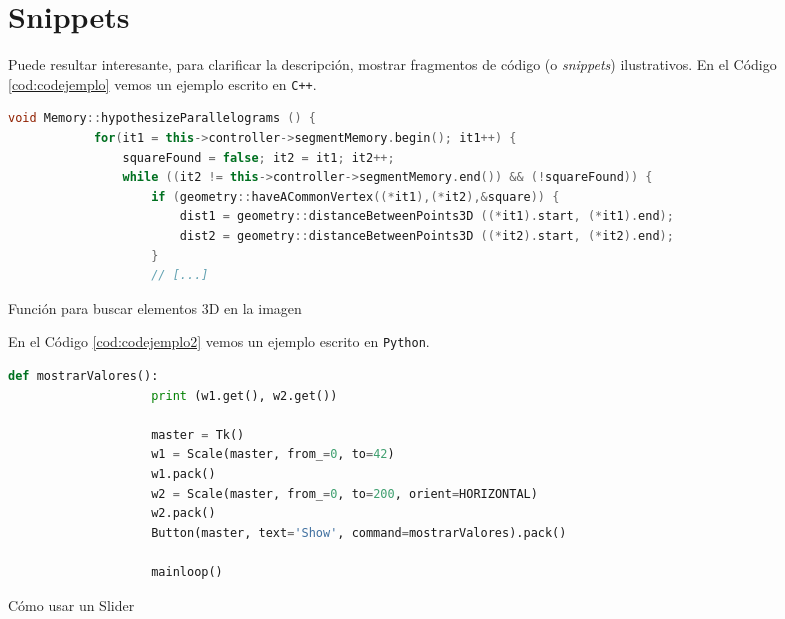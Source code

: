 


\section{Snippets}

Puede resultar interesante, para clarificar la descripción, mostrar fragmentos de código (o \textit{snippets}) ilustrativos. En el Código \ref{cod:codejemplo} vemos un ejemplo escrito en \texttt{C++}.

\begin{code}[h]
	\begin{lstlisting}[language=C++]
		void Memory::hypothesizeParallelograms () {
			for(it1 = this->controller->segmentMemory.begin(); it1++) {
				squareFound = false; it2 = it1; it2++;
				while ((it2 != this->controller->segmentMemory.end()) && (!squareFound)) {
					if (geometry::haveACommonVertex((*it1),(*it2),&square)) {
						dist1 = geometry::distanceBetweenPoints3D ((*it1).start, (*it1).end);
						dist2 = geometry::distanceBetweenPoints3D ((*it2).start, (*it2).end);
					}
					// [...]
				\end{lstlisting}
				\caption[Función para buscar elementos 3D en la imagen]{Función para buscar elementos 3D en la imagen}
				\label{cod:codejemplo}
			\end{code}
			
			En el Código \ref{cod:codejemplo2} vemos un ejemplo escrito en \texttt{Python}.
			
			\begin{code}[h]
				\begin{lstlisting}[language=Python]
					def mostrarValores():
					print (w1.get(), w2.get())
					
					master = Tk()
					w1 = Scale(master, from_=0, to=42)
					w1.pack()
					w2 = Scale(master, from_=0, to=200, orient=HORIZONTAL)
					w2.pack()
					Button(master, text='Show', command=mostrarValores).pack()
					
					mainloop()
				\end{lstlisting}
				\caption[Cómo usar un Slider]{Cómo usar un Slider}
				\label{cod:codejemplo2}
			\end{code}
			
